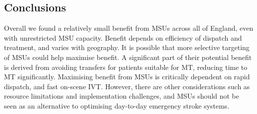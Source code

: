 \subsection{Conclusions}

Overall we found a relatively small benefit from MSUs across all of England, even with unrestricted MSU capacity. Benefit depends on efficiency of dispatch and treatment, and varies with geography. It is possible that more selective targeting of MSUs could help maximise benefit. A significant part of their potential benefit is derived from avoiding transfers for patients suitable for MT, reducing time to MT significantly. Maximising benefit from MSUs is critically dependent on rapid dispatch, and fast on-scene IVT. However, there are other considerations such as resource limitations and implementation challenges, and MSUs should not be seen as an alternative to optimising day-to-day emergency stroke systems.